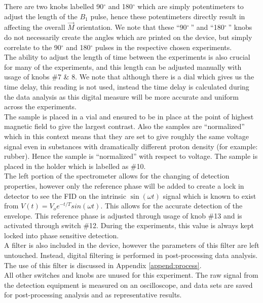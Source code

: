There are two knobs labelled 90$^\circ$ and 180$^\circ$ which are simply potentimeters to adjust the length of the $B_1$ pulse, hence these potentimeters directly result in affecting the overall $\vec{M}$ orientation. We note that these ``90$^\circ\:$'' and ``180$^\circ\:$'' knobs do not necessarily create the angles which are printed on the device, but simply correlate to the 90$^\circ$ and 180$^\circ$ pulses in the respective chosen experiments.\\

The ability to adjust the length of time between the experiments is also crucial for many of the experiments, and this length can be adjusted manually with usage of knobs \#7 \& 8. We note that although there is a dial which gives us the time delay, this reading is not used, instead the time delay is calculated during the data analysis as this digital measure will be more accurate and uniform across the experiments.\\

The sample is placed in a vial and ensured to be in place at the point of highest magnetic field to give the largest contrast. Also the samples are ``normalized'' which in this context means that they are set to give roughly the same voltage signal even in substances with dramatically different proton density (for example: rubber). Hence the sample is ``normalized'' with respect to voltage. The sample is placed in the holder which is labelled as \#10. \\

The left portion of the spectrometer allows for the changing of detection properties, however only the reference phase will be added to create a lock in detector to see the FID on the intrinsic $\sin(\omega t)$ signal which is known to exist from $V(t) = V_o e^{-t/T} sin(\omega t)$. This allows for the accurate detection of the envelope. This reference phase is adjusted through usage of knob \#13 and is activated through switch \#12. During the experiments, this value is always kept locked into phase sensitive detection.\\

A filter is also included in the device, however the parameters of this filter are left untouched. Instead, digital filtering is performed in post-processing data analysis. The use of this filter is discussed in Appendix \ref{append:process}.\\

All other switches and knobs are unused for this experiment. The raw signal from the detection equipment is measured on an oscilloscope, and data sets are saved for post-processing analysis and as representative results.

